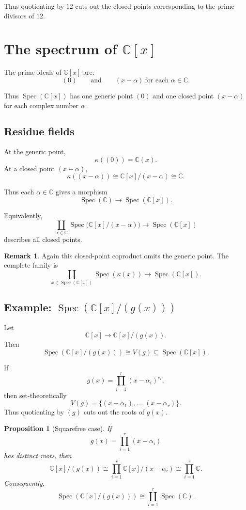 \documentclass[11pt]{article}
\newtheorem{proposition}[theorem]{Proposition}
\theoremstyle{definition}
\newtheorem{remark}[theorem]{Remark}
\newcommand{\C}{\mathbb{C}}
\newcommand{\Spec}{\operatorname{Spec}}
\newcommand{\kk}[1]{\kappa\!\left(#1\right)}
\begin{document}
	Thus quotienting by \(12\) cuts out the closed points corresponding to the prime divisors of \(12\).
	
	\section{The spectrum of \(\C[x]\)}
	
	The prime ideals of \(\C[x]\) are:
	\[
	(0)
	\qquad\text{and}\qquad
	(x-\alpha)\ \text{for each }\alpha\in \C.
	\]
	
	Thus \(\Spec(\C[x])\) has one generic point \((0)\) and one closed point \((x-\alpha)\) for each complex number \(\alpha\).
	
	\subsection{Residue fields}
	
	At the generic point,
	\[
	\kk{(0)}=\C(x).
	\]
	At a closed point \((x-\alpha)\),
	\[
	\kk{(x-\alpha)}\cong \C[x]/(x-\alpha)\cong \C.
	\]
	
	Thus each \(\alpha\in\C\) gives a morphism
	\[
	\Spec(\C)\to \Spec(\C[x]).
	\]
	
	Equivalently,
	\[
	\coprod_{\alpha\in \C}\Spec\!\bigl(\C[x]/(x-\alpha)\bigr)\to \Spec(\C[x])
	\]
	describes all closed points.
	
	\begin{remark}
		Again this closed-point coproduct omits the generic point. The complete family is
		\[
		\coprod_{x\in \Spec(\C[x])}\Spec(\kk{x})\to \Spec(\C[x]).
		\]
	\end{remark}
	
	\subsection{Example: \(\Spec(\C[x]/(g(x)))\)}
	
	Let
	\[
	\C[x]\to \C[x]/(g(x)).
	\]
	Then
	\[
	\Spec(\C[x]/(g(x)))\cong V(g)\subseteq \Spec(\C[x]).
	\]
	
	If
	\[
	g(x)=\prod_{i=1}^r (x-\alpha_i)^{e_i},
	\]
	then set-theoretically
	\[
	V(g)=\{(x-\alpha_1),\dots,(x-\alpha_r)\}.
	\]
	Thus quotienting by \((g)\) cuts out the roots of \(g(x)\).
	
	\begin{proposition}[Squarefree case]\label{prop:squarefree-Cx}
		If
		\[
		g(x)=\prod_{i=1}^r (x-\alpha_i)
		\]
		has distinct roots, then
		\[
		\C[x]/(g(x))
		\cong
		\prod_{i=1}^r \C[x]/(x-\alpha_i)
		\cong
		\prod_{i=1}^r \C.
		\]
		Consequently,
		\[
		\Spec(\C[x]/(g(x)))
		\cong
		\coprod_{i=1}^r \Spec(\C).
		\]
	\end{proposition}
	
\end{document}
